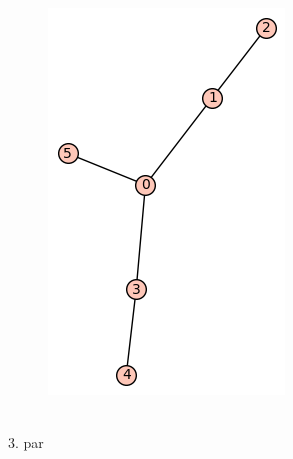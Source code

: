 \documentclass[12pt, a4paper]{article}
\begin{document}
\begin{figure}[h!]
\centering
\includegraphics[width=\linewidth]{t-11}
\end{figure} \\

3. par
\end{document}
